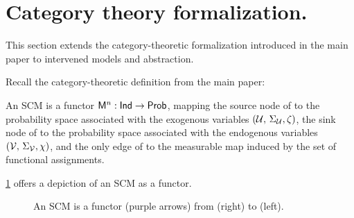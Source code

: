 
\section{Category theory formalization.}\label{app:CT}
This section extends the category-theoretic formalization introduced in the main paper to intervened models and abstraction.

Recall the category-theoretic definition from the main paper:
\begin{definition}\label{def:SCM_ct_app}
    An SCM is a functor $\mathsf{M}^n: \mathsf{Ind} \rightarrow \mathsf{Prob}$, mapping the source node of \Index to the probability space associated with the exogenous variables $(\mathcal{U},\, \Sigma_{\mathcal{U}}, \zeta)$, the sink node of \Index to the probability space associated with the endogenous variables $(\mathcal{V},\, \Sigma_{\mathcal{V}}, \chi)$, and the only edge of \Index to the measurable map induced by the set \myfunctional of functional assignments.
\end{definition}

\cref{fig:functor} offers a depiction of an SCM as a functor.

\begin{figure}
    \centering
    \caption{An SCM is a functor (purple arrows) from \Index (right) to \Prob (left).}
    \label{fig:functor}
\end{figure}

